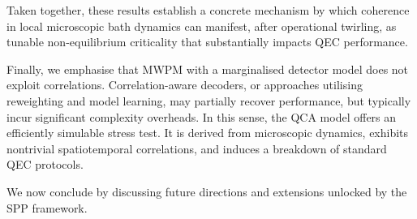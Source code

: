Taken together, these results establish a concrete mechanism by which coherence in local microscopic bath dynamics can manifest, after operational twirling, as tunable non-equilibrium criticality that substantially impacts QEC performance.

Finally, we emphasise that MWPM with a marginalised detector model does not exploit correlations. Correlation-aware decoders, or approaches utilising reweighting and model learning, may partially recover performance, but typically incur significant complexity overheads. In this sense, the QCA model offers an efficiently simulable stress test. It is derived from microscopic dynamics, exhibits nontrivial spatiotemporal correlations, and induces a breakdown of standard QEC protocols.

We now conclude by discussing future directions and extensions unlocked by the SPP framework.
